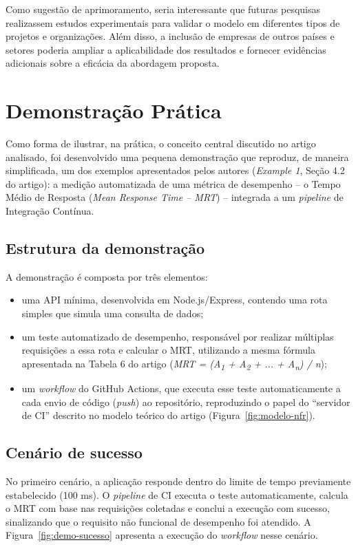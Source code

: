 \documentclass[12pt]{article}
\begin{document}
Como sugestão de aprimoramento, seria interessante que futuras pesquisas realizassem estudos experimentais para validar o modelo em diferentes tipos de projetos e organizações. Além disso, a inclusão de empresas de outros países e setores poderia ampliar a aplicabilidade dos resultados e fornecer evidências adicionais sobre a eficácia da abordagem proposta.


\section{Demonstração Prática}

Como forma de ilustrar, na prática, o conceito central discutido no artigo analisado, foi desenvolvido uma pequena demonstração que reproduz, de maneira simplificada, um dos exemplos apresentados pelos autores (\textit{Example 1}, Seção 4.2 do artigo): a medição automatizada de uma métrica de desempenho -- o Tempo Médio de Resposta (\textit{Mean Response Time -- MRT}) -- integrada a um \textit{pipeline} de Integração Contínua.

\subsection{Estrutura da demonstração}

A demonstração é composta por três elementos:

\begin{itemize}
    \item uma API mínima, desenvolvida em Node.js/Express, contendo uma rota simples que simula uma consulta de dados;
    \item um teste automatizado de desempenho, responsável por realizar múltiplas requisições a essa rota e calcular o MRT, utilizando a mesma fórmula apresentada na Tabela 6 do artigo (\textit{MRT = (A\textsubscript{1} + A\textsubscript{2} + ... + A\textsubscript{n}) / n});
    \item um \textit{workflow} do GitHub Actions, que executa esse teste automaticamente a cada envio de código (\textit{push}) ao repositório, reproduzindo o papel do ``servidor de CI'' descrito no modelo teórico do artigo (Figura~\ref{fig:modelo-nfr}).
\end{itemize}

\subsection{Cenário de sucesso}

No primeiro cenário, a aplicação responde dentro do limite de tempo previamente estabelecido (100 ms). O \textit{pipeline} de CI executa o teste automaticamente, calcula o MRT com base nas requisições coletadas e conclui a execução com sucesso, sinalizando que o requisito não funcional de desempenho foi atendido. A Figura~\ref{fig:demo-sucesso} apresenta a execução do \textit{workflow} nesse cenário.
\end{document}
